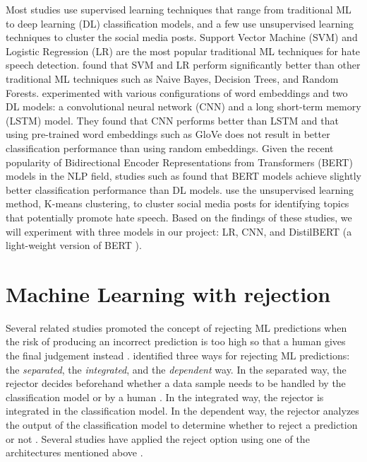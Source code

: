 Most studies use supervised learning techniques that range from traditional ML to deep learning (DL) classification models, and a few use unsupervised learning techniques to cluster the social media posts.
%
Support Vector Machine (SVM) \citep{greevy2004classifying, xiang2012detecting,davidson2017automated} and Logistic Regression (LR) \citep{waseem2016hateful, davidson2017automated} are the most popular traditional ML techniques for hate speech detection.
%
\citet{davidson2017automated} found that SVM and LR perform significantly better than other traditional ML techniques such as Naive Bayes, Decision Trees, and Random Forests.
%
\citet{badjatiya2017deep} experimented with various configurations of word embeddings and two DL models: a convolutional neural network (CNN) and a long short-term memory (LSTM) model.
%
They found that CNN performs better than LSTM and that using pre-trained word embeddings such as GloVe does not result in better classification performance than using random embeddings.
%
Given the recent popularity of Bidirectional Encoder Representations from Transformers (BERT) models \citep{devlin2018bert} in the NLP field, studies such as \citep{alatawi2021detecting} found that BERT models achieve slightly better classification performance than DL models.
%
\citet{rodriguez2019automatic} use the unsupervised learning method, K-means clustering, to cluster social media posts for identifying topics that potentially promote hate speech.
%
Based on the findings of these studies, we will experiment with three models in our project: LR, CNN, and DistilBERT (a light-weight version of BERT \citep{sanh2019distilbert}).


\section{Machine Learning with rejection}
\label{sec:related-work-rejection}
Several related studies promoted the concept of rejecting ML predictions when the risk of producing an incorrect prediction is too high so that a human gives the final judgement instead \citep{sayin2021science, hendrickx2021machine, woo2020future}.
%
\citet{hendrickx2021machine} identified three ways for rejecting ML predictions: the \emph{separated}, the \emph{integrated}, and the \emph{dependent} way.
%
In the separated way, the rejector decides beforehand whether a data sample needs to be handled by the classification model or by a human \citep{hendrickx2021machine}.
%
In the integrated way, the rejector is integrated in the classification model\citep{hendrickx2021machine}.
%
In the dependent way, the rejector analyzes the output of the classification model to determine whether to reject a prediction or not \citep{hendrickx2021machine}.
%
Several studies have applied the reject option using one of the architectures mentioned above \citep{coenen2020probability, grandvalet2008reject, Geifman2017Selective, geifman2019reject, de2000reject}.
%

